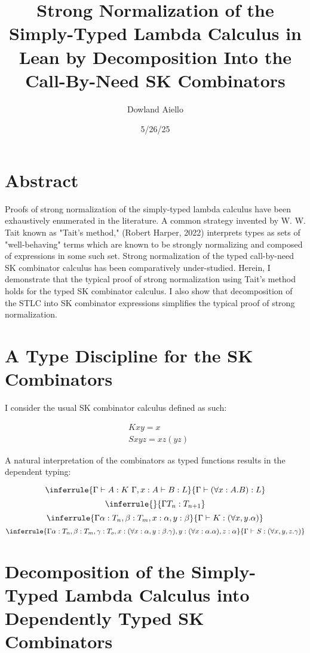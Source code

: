 \documentclass[11pt]{article}
\author{Dowland Aiello}
\date{5/26/25}
\title{Strong Normalization of the Simply-Typed Lambda Calculus in Lean by Decomposition Into the Call-By-Need SK Combinators}
\begin{document}
\maketitle
\tableofcontents

\section{Abstract}
\label{sec:orgd679f4b}

Proofs of strong normalization of the simply-typed lambda calculus have been exhaustively enumerated in the literature. A common strategy invented by W. W. Tait known as "Tait's method," (Robert Harper, 2022) interprets types as sets of "well-behaving" terms which are known to be strongly normalizing and composed of expressions in some such set.
Strong normalization of the typed call-by-need SK combinator calculus has been comparatively under-studied. Herein, I demonstrate that the typical proof of strong normalization using Tait's method holds for the typed SK combinator calculus. I also show that decomposition of the STLC into SK combinator expressions simplifies the typical proof of strong normalization.
\section{A Type Discipline for the SK Combinators}
\label{sec:orgee97b01}

I consider the usual SK combinator calculus defined as such:

\begin{align}
& K xy = x \\
& S xyz = xz (yz)
\end{align}

A natural interpretation of the combinators as typed functions results in the dependent typing:

\label{inference:1}

\[
\inferrule
  { \Gamma \vdash A : K \ \Gamma,x : A \vdash B : L }
  { \Gamma \vdash (\forall x : A.B) : L}
\]
\[
\inferrule
  { }
  { \Gamma T_{n} : T_{n + 1} }
\]
\[
\inferrule
  { \Gamma \alpha : T_{n}, \beta : T_{m}, x : \alpha, y : \beta }
  { \Gamma \vdash K : (\forall x, y.\alpha) }
\]
\[
\inferrule
  { \Gamma \alpha : T_{n}, \beta : T_{m}, \gamma : T_{o}, x : (\forall x : \alpha, y : \beta.\gamma), y : (\forall x : \alpha.\alpha), z : \alpha }
  { \Gamma \vdash S : (\forall x, y, z.\gamma) }
\]

\label{decomplemma:1}
\section{Decomposition of the Simply-Typed Lambda Calculus into Dependently Typed SK Combinators}
\label{sec:org562270d}
\end{document}

